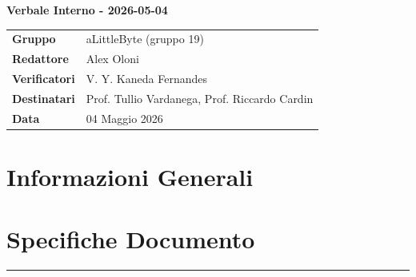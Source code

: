 \documentclass[a4paper,12pt]{article}
\begin{document}
\thispagestyle{firstpage}

\vspace*{0.5cm}

\begin{center}
    {\LARGE \textbf{Verbale Interno - 2026-05-04}}
\end{center}

\vspace{1.5cm}

\begin{center}
    \renewcommand{\arraystretch}{1.3}
    \begin{tcolorbox}[
        width=0.92\textwidth,
        colback=gray!6,
        colframe=gray!45,
        boxrule=0.5pt,
        arc=2mm,
        boxsep=0pt,
        left=8pt, right=8pt, top=8pt, bottom=8pt
    ]
        \begin{tabularx}{\linewidth}{>{\bfseries}p{3.5cm} X}
            Gruppo      & aLittleByte (gruppo 19) \\
            Redattore   & Alex Oloni \\
            Verificatori & V. Y. Kaneda Fernandes\\
            Destinatari & Prof. Tullio Vardanega, Prof. Riccardo Cardin \\
            Data        & 04 Maggio 2026\\
        \end{tabularx}
    \end{tcolorbox}
\end{center}

\newpage

\tableofcontents
\newpage
\section{Informazioni Generali}
\section*{Specifiche Documento}
\hrule
\vspace{1cm}
\end{document}
